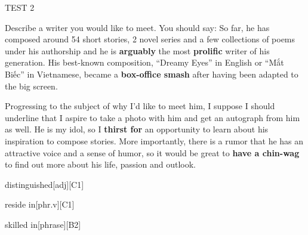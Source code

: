 \begin{glossarymc}[Cambridge 11]
\begin{test}{TEST 2}
\begin{qa}{Describe a writer you would like to meet. You should say:}
    So far, he has composed around 54 short stories, 2 novel series and a few collections of poems under his authorship and he is \textbf{arguably} the most \textbf{prolific} writer of his generation. His best-known composition, “Dreamy Eyes” in English or “Mắt Biếc” in Vietnamese, became a \textbf{box-office smash} after having been adapted to the big screen.  

    Progressing to the subject of why I’d like to meet him, I suppose I should underline that I aspire to take a photo with him and get an autograph from him as well. He is my idol, so I \textbf{thirst for} an opportunity to learn about his inspiration to compose stories. More importantly, there is a rumor that he has an attractive voice and a sense of humor, so it would be great to \textbf{have a chin-wag} to find out more about his life, passion and outlook.
    \end{qa}

        \begin{VocabExplain}[Part 2]
            \begin{ExplainCard}{distinguished}[adj][C1]
            \end{ExplainCard}

            \begin{ExplainCard}{reside in}[phr.v][C1]
            \end{ExplainCard}

            \begin{ExplainCard}{skilled in}[phrase][B2]
            \end{ExplainCard}


\end{VocabExplain}
\end{test}
\end{glossarymc}
